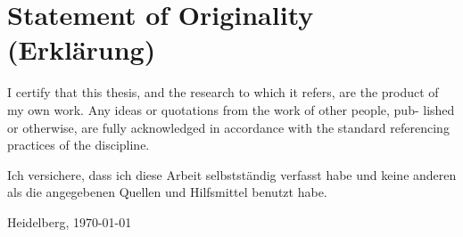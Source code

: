 \setlength{\parindent}{0em}
\section*{Statement of Originality (Erkl\"{a}rung)}
\vspace{3\baselineskip}
I certify that this thesis, and the research to which it refers, are the product
of my own work. Any ideas or quotations from the work of other people, pub-
lished or otherwise, are fully acknowledged in accordance with the standard
referencing practices of the discipline.

\vspace{3\baselineskip}
Ich versichere, dass ich diese Arbeit selbstst\"{a}ndig verfasst habe und keine
anderen als die angegebenen Quellen und Hilfsmittel benutzt habe.\par
\vspace{5\baselineskip}
Heidelberg, \today \hspace{3cm}\dotfill